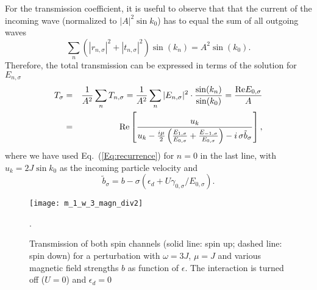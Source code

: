 \documentclass[aps,twocolumn,showpacs,floatfix,prl]{revtex4}
\newcommand{\be}{\begin{equation}}
\newcommand{\ee}{\end{equation}}
\newcommand{\bea}{\begin{eqnarray}}
\newcommand{\eea}{\end{eqnarray}}
\begin{document}
For the transmission coefficient, it is useful to observe that 
that the current of the incoming wave (normalized to $|A|^2 \sin k_0$) has to equal the sum of all outgoing waves
\be 
\sum_{n} \left(|r_{n,\sigma}|^2 + |t_{n,\sigma}|^2 \right) \sin(k_n) = A^2 \sin(k_0).
\ee
Therefore, 
the total transmission can be expressed in terms of the solution for $E_{n,\sigma}$ 
\bea 
T_{\sigma} &=& \frac{1}{A^2}\sum_{n} T_{n,\sigma} = \frac{1}{A^2} \sum_{n} |E_{n,\sigma}|^2 \cdot \frac{\sin(k_{n})}{\sin(k_0)} = \frac{{\rm Re} E_{0,\sigma}}{A}\nonumber\\
&=& {\rm Re}\left[\frac{u_k}{u_k - \frac{i \mu}{2} \left(\frac{E_{1,\sigma}}{E_{0,\sigma}} + \frac{E_{-1,\sigma}}{E_{0,\sigma}} \right) -  i\, \sigma \tilde{b}_{\sigma} }\right], \label{transmission}
\eea
where we have used Eq.~(\ref{Eq:recurrence}) for $n = 0$ in the last line, with
$u_k=2J\sin k_0$ as the incoming particle velocity and 
\be
\tilde{b}_{\sigma} = b - \sigma(\epsilon_d + U\gamma_{0,\sigma}/E_{0,\sigma}).
\label{eq_btilde}
\ee


\begin{figure}[t]
\texttt{[image: m\_1\_w\_3\_magn\_div2]}
 \caption{Transmission of both spin channels (solid line: spin up; dashed line: spin down) for a perturbation with $\omega=3J$, $\mu=J$ and various magnetic field strengths $b$ as function of $\epsilon$. The interaction is turned off ($U=0$) and $\epsilon_d=0$}.
\label{m_1_w_3_magn_div}
\end{figure}
\end{document}
